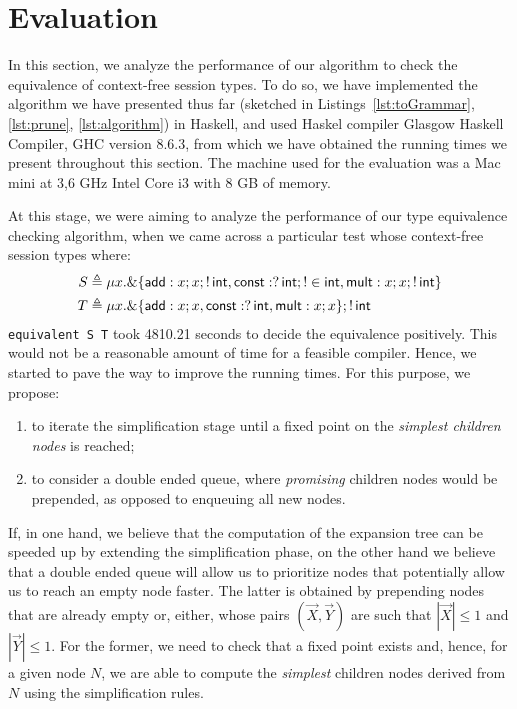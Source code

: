 \section{Evaluation}
\label{sec:evaluation}

In this section, we analyze the performance of our algorithm
to check the equivalence of context-free session types. 
To do so, we have implemented the algorithm we have presented
thus far (sketched in Listings~\ref{lst:toGrammar}, 
\ref{lst:prune}, \ref{lst:algorithm}) 
in Haskell, and used Haskel compiler 
Glasgow Haskell Compiler, GHC version 8.6.3, from which we have 
obtained the running times we present throughout this section.
The machine used for the evaluation was a Mac mini at 3,6 GHz Intel 
Core i3 with 8 GB of memory. 

At this stage, we were aiming to analyze the performance of
our type equivalence checking algorithm, when we came across 
a particular test whose context-free session types where:
\begin{equation}
\label{ex:chaotic}
	\begin{aligned}
		S &\triangleq \mu x . \&\{ \mathsf{add}: x;x; !\,\mathsf{int},
							       \mathsf{const}: ?\,\mathsf{int};!\in\mathsf{int},
							       \mathsf{mult}: x;x;!\,\mathsf{int}\}\\
		T &\triangleq \mu x . \&\{ \mathsf{add}: x;x,
							  	   \mathsf{const}: ?\,\mathsf{int},
							       \mathsf{mult}: x;x\}; !\,\mathsf{int}
	\end{aligned}
\end{equation}
\lstinline{equivalent S T} took 4810.21 seconds to decide the equivalence
positively. This would not be a reasonable amount of time for a
feasible compiler. Hence, we started to pave the way to improve the
running times. For this purpose, we propose:
\begin{enumerate}
	\item to iterate the simplification stage until a fixed point
	on the \emph{simplest children nodes} is reached;
	\item to consider a double ended queue, where \emph{promising} 
	children nodes would be prepended, as opposed to enqueuing 
	all new nodes.
\end{enumerate}

If, in one hand, we believe that the computation of the expansion
tree can be speeded up by extending the simplification phase, on 
the other hand we believe that a double ended queue will allow us to 
prioritize nodes that potentially allow us to reach an empty node faster.
The latter is obtained by prepending nodes that are already empty or, 
either, whose pairs $(\vec X, \vec Y)$ are such that $|\vec X|\leq 1$
and $|\vec Y| \leq 1$.
For the former, we need to check that a fixed point exists and,
hence, for a given node $N$, we are able to compute the 
\emph{simplest} children nodes derived from $N$ using the
simplification rules.

